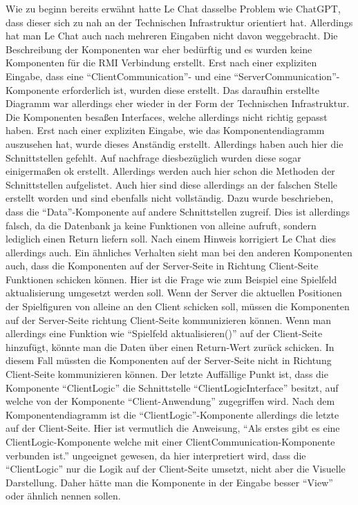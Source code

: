 Wie zu beginn bereits erwähnt hatte Le Chat dasselbe Problem wie ChatGPT, dass dieser sich zu nah an der Technischen Infrastruktur orientiert hat.
Allerdings hat man Le Chat auch nach mehreren Eingaben nicht davon weggebracht. Die Beschreibung der Komponenten war eher bedürftig und es wurden 
keine Komponenten für die RMI Verbindung erstellt. Erst nach einer expliziten Eingabe, dass eine ``ClientCommunication''- und eine 
``ServerCommunication''-Komponente erforderlich ist, wurden diese erstellt. Das daraufhin erstellte Diagramm war allerdings eher wieder in der Form 
der Technischen Infrastruktur. Die Komponenten besaßen Interfaces, welche allerdings nicht richtig gepasst haben. Erst nach einer expliziten Eingabe, wie
das Komponentendiagramm auszusehen hat, wurde dieses Anständig erstellt. Allerdings haben auch hier die Schnittstellen gefehlt. Auf nachfrage diesbezüglich
wurden diese sogar einigermaßen ok erstellt. Allerdings werden auch hier schon die Methoden der Schnittstellen aufgelistet. Auch hier sind diese allerdings 
an der falschen Stelle erstellt worden und sind ebenfalls nicht vollständig. Dazu wurde beschrieben, dass die ``Data''-Komponente auf andere Schnittstellen
zugreif. Dies ist allerdings falsch, da die Datenbank ja keine Funktionen von alleine aufruft, sondern lediglich einen Return liefern soll. Nach einem Hinweis 
korrigiert Le Chat dies allerdings auch. Ein ähnliches Verhalten sieht man bei den anderen Komponenten auch, dass die Komponenten auf der Server-Seite in Richtung
Client-Seite Funktionen schicken können. Hier ist die Frage wie zum Beispiel eine Spielfeld aktualisierung umgesetzt werden soll. Wenn der Server die aktuellen 
Positionen der Spielfiguren von alleine an den Client schicken soll, müssen die Komponenten auf der Server-Seite richtung Client-Seite kommunizieren können.
Wenn man allerdings eine Funktion wie ``Spielfeld aktualisieren()'' auf der Client-Seite hinzufügt, könnte man die Daten über einen Return-Wert zurück schicken.
In diesem Fall müssten die Komponenten auf der Server-Seite nicht in Richtung Client-Seite kommunizieren können. Der letzte Auffällige Punkt ist, dass die 
Komponente ``ClientLogic'' die Schnittstelle ``ClientLogicInterface'' besitzt, auf welche von der Komponente ``Client-Anwendung'' zugegriffen wird. Nach dem 
Komponentendiagramm ist die ``ClientLogic''-Komponente allerdings die letzte auf der Client-Seite. Hier ist vermutlich die Anweisung, ``Als erstes gibt es 
eine ClientLogic-Komponente welche mit einer ClientCommunication-Komponente verbunden ist.'' ungeeignet gewesen, da hier interpretiert wird, dass die ``ClientLogic''
nur die Logik auf der Client-Seite umsetzt, nicht aber die Visuelle Darstellung. Daher hätte man die Komponente in der Eingabe besser ``View'' oder ähnlich nennen
sollen.\\

